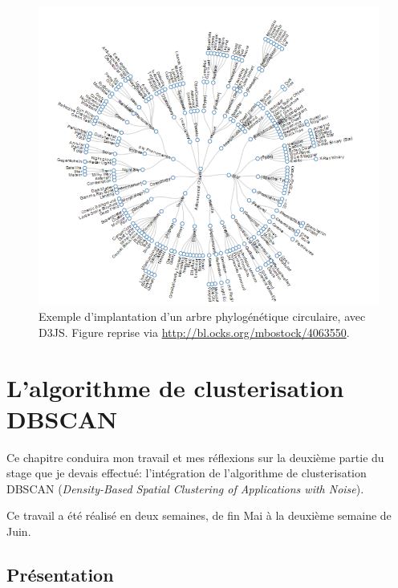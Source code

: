 \documentclass[pdftex,12pt,a4paper]{report}
\begin{document}
\begin{spacing}{1.2}
\begin{figure}[H]
\begin{center}
	\includegraphics[scale=0.6]{img/phylogenetic_tree_d3js.png}
\end{center}
\caption{Exemple d'implantation d'un arbre phylogénétique circulaire, avec D3JS. Figure reprise via \url{http://bl.ocks.org/mbostock/4063550}.}
\end{figure}

\chapter{L'algorithme de clusterisation DBSCAN}

Ce chapitre conduira mon travail et mes réflexions sur la deuxième partie du stage que je devais effectué: l'intégration de l'algorithme de clusterisation DBSCAN (\textit{Density-Based Spatial Clustering of Applications with Noise}).

Ce travail a été réalisé en deux semaines, de fin Mai à la deuxième semaine de Juin.

\section{Présentation}


\end{spacing}
\end{document}
